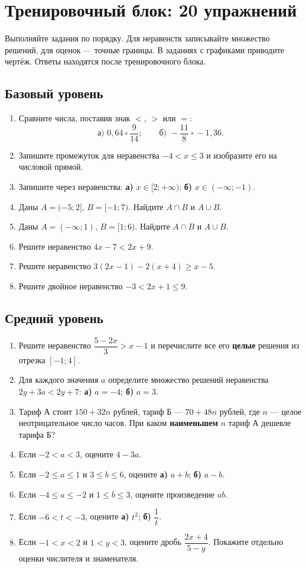\documentclass[a4paper,12pt]{article}
\begin{document}
\section*{\color{darkaccent}Тренировочный блок: 20 упражнений}
Выполняйте задания по порядку. Для неравенств записывайте множество решений, для оценок --- точные границы. В заданиях с графиками приводите чертёж. Ответы находятся после тренировочного блока.

\subsection*{\color{accent}Базовый уровень}
\begin{enumerate}[start=1]
\item Сравните числа, поставив знак $<$, $>$ или $=$:
\[
\text{а) }0{,}64\ \square\ \frac9{14};\qquad
\text{б) }-\frac{11}{8}\ \square\ -1{,}36.
\]
\item Запишите промежуток для неравенства $-4<x\le3$ и изобразите его на числовой прямой.
\item Запишите через неравенства: \textbf{а)} $x\in[2;+\infty)$; \textbf{б)} $x\in(-\infty;-1)$.
\item Даны $A=(-5;2]$, $B=[-1;7)$. Найдите $A\cap B$ и $A\cup B$.
\item Даны $A=(-\infty;1)$, $B=[1;6)$. Найдите $A\cap B$ и $A\cup B$.
\item Решите неравенство $4x-7<2x+9$.
\item Решите неравенство $3(2x-1)-2(x+4)\ge x-5$.
\item Решите двойное неравенство $-3<2x+1\le9$.
\end{enumerate}

\subsection*{\color{accent}Средний уровень}
\begin{enumerate}[start=9]
\item Решите неравенство $\dfrac{5-2x}{3}>x-1$ и перечислите все его \textbf{целые} решения из отрезка $[-1;4]$.
\item Для каждого значения $a$ определите множество решений неравенства $2y+3a<2y+7$: \textbf{а)} $a=-4$; \textbf{б)} $a=3$.
\item Тариф А стоит $150+32n$ рублей, тариф Б --- $70+48n$ рублей, где $n$ --- целое неотрицательное число часов. При каком \textbf{наименьшем} $n$ тариф А дешевле тарифа Б?
\item Если $-2<a<3$, оцените $4-3a$.
\item Если $-2\le a\le1$ и $3\le b\le6$, оцените \textbf{а)} $a+b$; \textbf{б)} $a-b$.
\item Если $-4\le a\le-2$ и $1\le b\le3$, оцените произведение $ab$.
\item Если $-6<t<-3$, оцените \textbf{а)} $t^2$; \textbf{б)} $\dfrac1t$.
\item Если $-1<x<2$ и $1<y<3$, оцените дробь $\dfrac{2x+4}{5-y}$. Покажите отдельно оценки числителя и знаменателя.
\end{enumerate}
\end{document}
